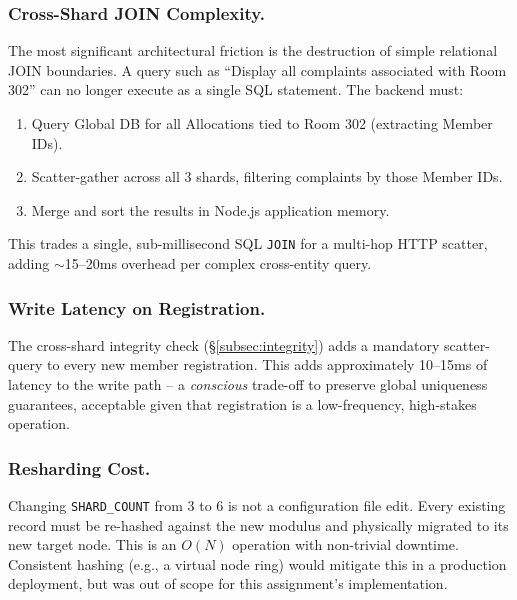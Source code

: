 \documentclass[sigconf]{acmart}
\begin{document}
\subsubsection{Cross-Shard JOIN Complexity.}
The most significant architectural friction is the destruction of simple relational JOIN boundaries. A query such as ``Display all complaints associated with Room 302'' can no longer execute as a single SQL statement. The backend must:
\begin{enumerate}[leftmargin=*]
    \item Query Global DB for all Allocations tied to Room 302 (extracting Member IDs).
    \item Scatter-gather across all 3 shards, filtering complaints by those Member IDs.
    \item Merge and sort the results in Node.js application memory.
\end{enumerate}
This trades a single, sub-millisecond SQL \texttt{JOIN} for a multi-hop HTTP scatter, adding $\sim$15--20ms overhead per complex cross-entity query.

\subsubsection{Write Latency on Registration.}
The cross-shard integrity check (\S\ref{subsec:integrity}) adds a mandatory scatter-query to every new member registration. This adds approximately 10--15ms of latency to the write path -- a \textit{conscious} trade-off to preserve global uniqueness guarantees, acceptable given that registration is a low-frequency, high-stakes operation.

\subsubsection{Resharding Cost.}
Changing \texttt{SHARD\_COUNT} from 3 to 6 is not a configuration file edit. Every existing record must be re-hashed against the new modulus and physically migrated to its new target node. This is an $O(N)$ operation with non-trivial downtime. Consistent hashing (e.g., a virtual node ring) would mitigate this in a production deployment, but was out of scope for this assignment's implementation.
\end{document}
